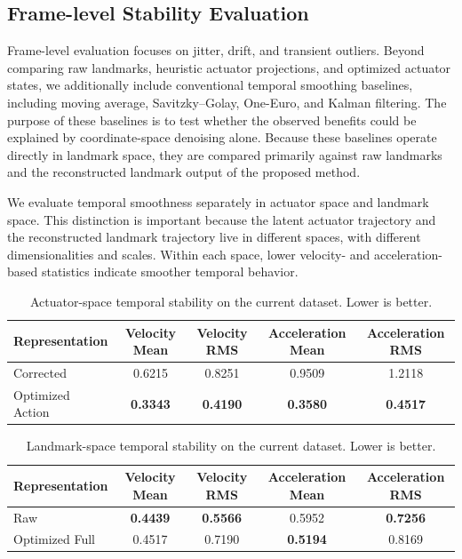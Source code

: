\documentclass[11pt]{article}
\begin{document}
\subsection{Frame-level Stability Evaluation}
Frame-level evaluation focuses on jitter, drift, and transient outliers. Beyond comparing raw landmarks, heuristic actuator projections, and optimized actuator states, we additionally include conventional temporal smoothing baselines, including moving average, Savitzky--Golay, One-Euro, and Kalman filtering. The purpose of these baselines is to test whether the observed benefits could be explained by coordinate-space denoising alone. Because these baselines operate directly in landmark space, they are compared primarily against raw landmarks and the reconstructed landmark output of the proposed method.

We evaluate temporal smoothness separately in actuator space and landmark space. This distinction is important because the latent actuator trajectory and the reconstructed landmark trajectory live in different spaces, with different dimensionalities and scales. Within each space, lower velocity- and acceleration-based statistics indicate smoother temporal behavior.

\begin{table}[t]
\centering
\caption{Actuator-space temporal stability on the current dataset. Lower is better.}
\label{tab:jitter_actuator}
\small
\begin{tabular}{@{}lcccc@{}}
\toprule
Representation & Velocity Mean & Velocity RMS & Acceleration Mean & Acceleration RMS \\
\midrule
Corrected & 0.6215 & 0.8251 & 0.9509 & 1.2118 \\
Optimized Action & \textbf{0.3343} & \textbf{0.4190} & \textbf{0.3580} & \textbf{0.4517} \\
\bottomrule
\end{tabular}
\end{table}

\begin{table}[t]
\centering
\caption{Landmark-space temporal stability on the current dataset. Lower is better.}
\label{tab:jitter_landmark}
\small
\begin{tabular}{@{}lcccc@{}}
\toprule
Representation & Velocity Mean & Velocity RMS & Acceleration Mean & Acceleration RMS \\
\midrule
Raw & \textbf{0.4439} & \textbf{0.5566} & 0.5952 & \textbf{0.7256} \\
Optimized Full & 0.4517 & 0.7190 & \textbf{0.5194} & 0.8169 \\
\bottomrule
\end{tabular}
\end{table}
\end{document}
